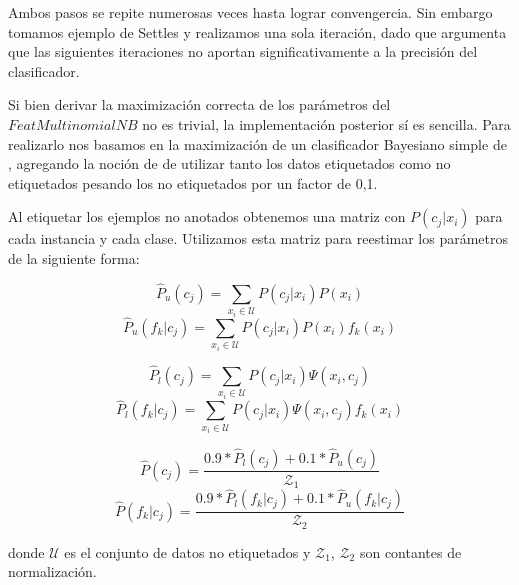 Ambos pasos se repite numerosas veces hasta lograr convengercia. Sin embargo tomamos ejemplo de Settles y realizamos una sola iteración, dado que argumenta que las siguientes iteraciones no aportan significativamente a la precisión del clasificador.

Si bien derivar la maximización correcta de los parámetros del $FeatMultinomialNB$ no es trivial, la implementación posterior sí es sencilla. Para realizarlo nos basamos en la maximización de un clasificador Bayesiano simple de \citet{data-mining-Liu}, agregando la noción de \citet{dualist} de utilizar tanto los datos etiquetados como no etiquetados pesando los no etiquetados por un factor de 0,1.

Al etiquetar los ejemplos no anotados obtenemos una matriz con $P(c_j|x_i)$ para cada instancia y cada clase. Utilizamos esta matriz para reestimar los parámetros de la siguiente forma:

\begin{equation*}
\hat{P}_u(c_j) = \sum_{x_i \in \mathcal{U}} P(c_j|x_i) P(x_i)
\end{equation*}
\begin{equation*}
\hat{P}_u(f_k|c_j) = \sum_{x_i \in \mathcal{U}} P(c_j|x_i) P(x_i) f_k(x_i)
\end{equation*}

\begin{equation*}
\hat{P}_l(c_j) = \sum_{x_i \in \mathcal{U}} P(c_j|x_i) \Psi(x_i, c_j)
\end{equation*}
\begin{equation*}
\hat{P}_l(f_k|c_j) = \sum_{x_i \in \mathcal{U}} P(c_j|x_i) \Psi(x_i, c_j) f_k(x_i)
\end{equation*}

\begin{equation}
\hat{P}(c_j) = \frac{0.9 * \hat{P}_l(c_j) + 0.1 * \hat{P}_u(c_j)}{\mathcal{Z}_1}
\end{equation}
\begin{equation}
\hat{P}(f_k|c_j) = \frac{0.9 * \hat{P}_l(f_k|c_j) + 0.1 * \hat{P}_u(f_k|c_j)}{\mathcal{Z}_2}
\end{equation}

donde $\mathcal{U}$ es el conjunto de datos no etiquetados y $\mathcal{Z}_1$, $\mathcal{Z}_2$ son contantes de normalización.



